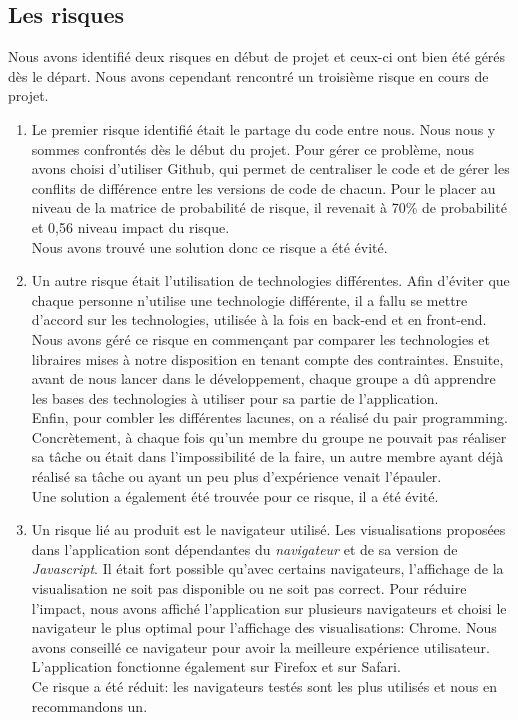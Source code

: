 \documentclass[t, 12pt, usenames,dvipsnames]{article}
\begin{document}
    \subsection{Les risques}
        \noindent Nous avons identifié deux risques en début de projet et ceux-ci ont bien été gérés dès le départ. Nous avons cependant rencontré un troisième risque en cours de projet. 
    
    \begin{enumerate}
        \item Le premier risque identifié était le partage du code entre nous. Nous nous y sommes confrontés dès le début du projet. Pour gérer ce problème, nous avons choisi d'utiliser Github, qui permet de  centraliser le code et de gérer les conflits de différence entre les versions de code de chacun. Pour le placer au niveau de la matrice de probabilité de risque, il revenait à 70\% de probabilité et 0,56 niveau impact du risque. \\ Nous avons trouvé une solution donc ce risque a été évité.
        \item Un autre risque était l'utilisation de technologies différentes. Afin d'éviter que chaque personne n'utilise une technologie différente, il a fallu se mettre d'accord sur les technologies, utilisée à la fois en back-end et en front-end. Nous avons géré ce risque en commençant par comparer les technologies et libraires mises à notre disposition en tenant compte des contraintes.
        Ensuite, avant de nous lancer dans le développement, chaque groupe a dû apprendre les bases des technologies à utiliser pour sa partie de l'application.\\
        Enfin, pour combler les différentes lacunes, on a réalisé du pair programming.
        Concrètement, à chaque fois qu'un membre du groupe ne pouvait pas réaliser sa tâche ou était dans l'impossibilité de la faire, un autre membre ayant déjà réalisé sa tâche ou ayant un peu plus d'expérience venait l'épauler.\\ Une solution a également été trouvée pour ce risque, il a été évité.
        \item Un risque lié au produit est le navigateur utilisé. Les visualisations proposées dans l'application sont dépendantes du \textit{navigateur} et de sa version de \textit{Javascript}. Il était fort possible qu'avec certains navigateurs, l'affichage de la visualisation ne soit pas disponible ou ne soit pas correct. Pour réduire l'impact, nous avons affiché l'application sur plusieurs navigateurs et choisi le navigateur le plus optimal pour l'affichage des visualisations: Chrome. Nous avons conseillé ce navigateur pour avoir la meilleure expérience utilisateur. L'application fonctionne également sur Firefox et sur Safari.\\ Ce risque a été réduit: les navigateurs testés sont les plus utilisés et nous en recommandons un.
    \end{enumerate}
    
\end{document}

